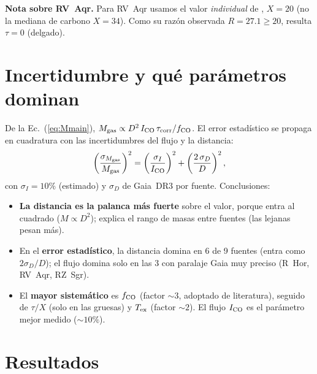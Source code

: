 \documentclass[12pt, a4paper]{article}
\begin{document}
\noindent \textbf{Nota sobre RV~Aqr.} Para RV~Aqr usamos el valor \emph{individual} de
\citet{ramstedt2014}, $X=20$ (no la mediana de carbono $X=34$). Como su razón observada
$R=27.1 \geq 20$, resulta $\tau=0$ (delgado).

\section{Incertidumbre y qué parámetros dominan}

De la Ec.~(\ref{eq:Mmain}), $M_{\rm gas}\propto D^2\,I_{\rm CO}\,\tau_{\rm corr}/f_{\rm CO}$.
El error estadístico se propaga en cuadratura con las incertidumbres del flujo y la distancia:
\begin{equation}
    \left(\frac{\sigma_{M_{\rm gas}}}{M_{\rm gas}}\right)^2 =
    \left(\frac{\sigma_I}{I_{\rm CO}}\right)^2 + \left(\frac{2\,\sigma_D}{D}\right)^2,
    \label{eq:err}
\end{equation}
con $\sigma_I = 10\%$ (estimado) y $\sigma_D$ de Gaia~DR3 por fuente. Conclusiones:
\begin{itemize}
    \item \textbf{La distancia es la palanca más fuerte} sobre el valor, porque entra al
    cuadrado ($M\propto D^2$); explica el rango de masas entre fuentes (las lejanas pesan más).
    \item En el \textbf{error estadístico}, la distancia domina en 6 de 9 fuentes (entra como
    $2\sigma_D/D$); el flujo domina solo en las 3 con paralaje Gaia muy preciso (R~Hor,
    RV~Aqr, RZ~Sgr).
    \item El \textbf{mayor sistemático} es $f_{\rm CO}$ (factor $\sim3$, adoptado de
    literatura), seguido de $\tau/X$ (solo en las gruesas) y $T_{\rm ex}$ (factor $\sim2$).
    El flujo $I_{\rm CO}$ es el parámetro mejor medido ($\sim10\%$).
\end{itemize}

\section{Resultados}
\end{document}
